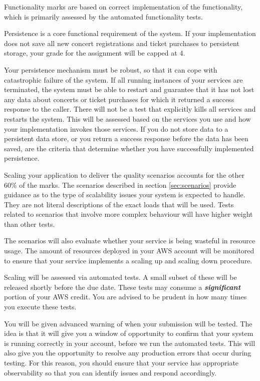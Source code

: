 \documentclass{csse4400}
\begin{document}
Functionality marks are based on correct implementation of the functionality,
which is primarily assessed by the automated functionality tests.

Persistence is a core functional requirement of the system.
If your implementation does not save all new concert registrations and ticket purchases to persistent storage,
your grade for the assignment will be capped at 4.

Your persistence mechanism must be robust, so that it can cope with catastrophic failure of the system.
If all running instances of your services are terminated,
the system must be able to restart and guarantee that it has not lost any data about concerts or ticket purchases
for which it returned a success response to the caller.
There will not be a test that explicitly kills all services and restarts the system.
This will be assessed based on the services you use and how your implementation invokes those services.
If you do not store data to a persistent data store,
or you return a success response before the data has been saved,
are the criteria that determine whether you have successfully implemented persistence.

Scaling your application to deliver the quality scenarios accounts for the other 60\% of the marks.
The scenarios described in section \ref{sec:scenarios} provide guidance as to the type of scalability issues your system is expected to handle.
They are not literal descriptions of the exact loads that will be used.
Tests related to scenarios that involve more complex behaviour will have higher weight than other tests.

The scenarios will also evaluate whether your service is being wasteful in resource usage.
The amount of resources deployed in your AWS account will be monitored to ensure that your service implements a scaling up and scaling down procedure.

Scaling will be assessed via automated tests.
A small subset of these will be released shortly before the due date.
These tests may consume a \textbf{\emph{significant}} portion of your AWS credit.
You are advised to be prudent in how many times you execute these tests.

You will be given advanced warning of when your submission will be tested.
The idea is that it will give you a window of opportunity to confirm that your system is running correctly in your account,
before we run the automated tests.
This will also give you the opportunity to resolve any production errors that occur during testing.
For this reason,
you should ensure that your service has appropriate observability so that you can identify issues and respond accordingly.
\end{document}
